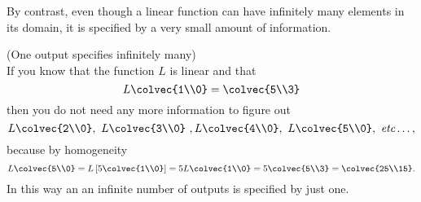 By contrast, even though a linear function can have infinitely many elements in its domain, it is specified by a very small amount of information. 

\begin{example} (One output specifies infinitely many)\\ 
If you know that the function $L$ is linear and that 
$$L\colvec{1\\0}  =\colvec{5\\3}$$ 
then you do not need any more information to figure out 
$$L\colvec{2\\0},~L\colvec{3\\0}~,L\colvec{4\\0},~L\colvec{5\\0} ,{\rm ~\mbox{\it etc}}\ldots, $$ 
because by homogeneity
$$L\colvec{5\\0}=L\left[ 5\colvec{1\\0} \right] = 5 L\colvec{1\\0}=5\colvec{5\\3}=\colvec{25\\15}.$$
In this way an an infinite number of outputs is specified by just one.
\end{example}

